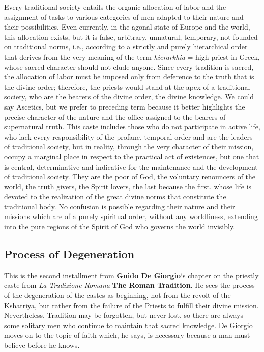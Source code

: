 Every traditional society entails the organic allocation of labor and the assignment of tasks to various categories of men adapted to their nature and their possibilities. Even currently, in the agonal state of Europe and the world, this allocation exists, but it is false, arbitrary, unnatural, temporary, not founded on traditional norms, i.e., according to a strictly and purely hierarchical order that derives from the very meaning of the term \emph{hierarkhia} = high priest in Greek, whose sacred character should not elude anyone. Since every tradition is sacred, the allocation of labor must be imposed only from deference to the truth that is the divine order; therefore, the priests would stand at the apex of a traditional society, who are the bearers of the divine order, the divine knowledge. We could say Ascetics, but we prefer to preceding term because it better highlights the precise character of the nature and the office assigned to the bearers of supernatural truth. This caste includes those who do not participate in active life, who lack every responsibility of the profane, temporal order and are the leaders of traditional society, but in reality, through the very character of their mission, occupy a marginal place in respect to the practical act of existences, but one that is central, determinative and indicative for the maintenance and the development of traditional society. They are the poor of God, the voluntary renouncers of the world, the truth givers, the Spirit lovers, the last because the first, whose life is devoted to the realization of the great divine norms that constitute the traditional body. No confusion is possible regarding their nature and their missions which are of a purely spiritual order, without any worldliness, extending into the pure regions of the Spirit of God who governs the world invisibly.

\subsection*{Process of Degeneration}
\begin{quotex}
This is the second installment from \textbf{Guido De Giorgio}`s chapter on the priestly caste from \textit{La Tradizione Romana} \textbf{The Roman Tradition}. He sees the process of the degeneration of the castes as beginning, not from the revolt of the Kshatriya, but rather from the failure of the Priests to fulfill their divine mission. Nevertheless, Tradition may be forgotten, but never lost, so there are always some solitary men who continue to maintain that sacred knowledge. De Giorgio moves on to the topic of faith which, he says, is necessary because a man must believe before he knows.
\end{quotex}

